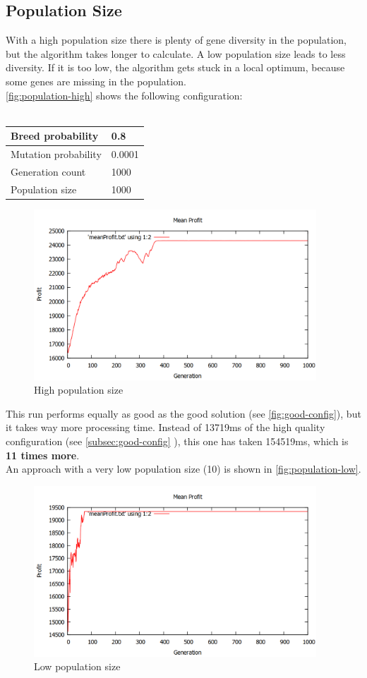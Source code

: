 \documentclass[fontsize=12pt,toc=bibliography, notitlepage]{scrreprt}
\newcommand{\refnn}[1]{\ref{#1} \nameref{#1}}
\begin{document}
\subsection{Population Size}
\label{subsec:population-size}
With a high population size there is plenty of gene diversity in the population, but the algorithm takes longer to calculate. A low population size leads to less diversity. If it is too low, the algorithm gets stuck in a local optimum, because some genes are missing in the population.\\
\autoref{fig:population-high} shows the following configuration: \\ \\
\begin{tabular}{ |l|l| }
	\hline
	Breed probability & 0.8 \\ \hline
	Mutation probability & 0.0001 \\ \hline
	Generation count & 1000 \\ \hline
	Population size & 1000 \\ \hline
\end{tabular}
\begin{figure}[H]
	\centering
	\includegraphics[width=400px]{images/population-high.png}
	\caption{High population size}
	\label{fig:population-high}
\end{figure}
This run performs equally as good as the good solution (see \autoref{fig:good-config}), but it takes way more processing time. Instead of 13719ms of the high quality configuration (see \refnn{subsec:good-config}), this one has taken 154519ms, which is \textbf{11 times more}.\\
An approach with a very low population size (10) is shown in \autoref{fig:population-low}.
\begin{figure}[H]
	\centering
	\includegraphics[width=400px]{images/population-low.png}
	\caption{Low population size}
	\label{fig:population-low}
\end{figure}
\end{document}
